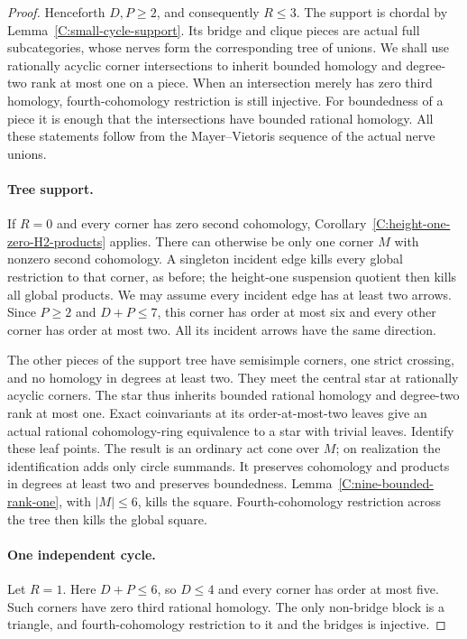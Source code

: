 \begin{proof}
Henceforth $D,P\geq2$, and consequently $R\leq3$.
The support is chordal by Lemma~\ref{C:small-cycle-support}.
Its bridge and clique pieces are actual full subcategories,
whose nerves form the corresponding tree of unions.
We shall use rationally acyclic corner intersections to
inherit bounded homology and degree-two rank at most one
on a piece.  When an intersection merely has zero third
homology, fourth-cohomology restriction is still injective.
For boundedness of a piece it is enough that the intersections
have bounded rational homology.  All these statements follow
from the Mayer--Vietoris sequence of the actual nerve unions.

\paragraph{Tree support.}
If $R=0$ and every corner has zero second cohomology,
Corollary~\ref{C:height-one-zero-H2-products} applies.
There can otherwise be only one corner $M$ with nonzero
second cohomology.  A singleton incident edge kills every
global restriction to that corner, as before; the
height-one suspension quotient then kills all global products.
We may assume every incident edge has at least two arrows.
Since $P\geq2$ and $D+P\leq7$, this corner has order at
most six and every other corner has order at most two.
All its incident arrows have the same direction.

The other pieces of the support tree have semisimple
corners, one strict crossing, and no homology in degrees
at least two.  They meet the central star at rationally
acyclic corners.  The star thus inherits bounded rational
homology and degree-two rank at most one.  Exact coinvariants
at its order-at-most-two leaves give an actual rational
cohomology-ring equivalence to a star with trivial leaves.
Identify these leaf points.  The result is an ordinary
act cone over $M$; on realization the identification adds
only circle summands.  It preserves cohomology and products
in degrees at least two and preserves boundedness.
Lemma~\ref{C:nine-bounded-rank-one}, with $|M|\leq6$,
kills the square.  Fourth-cohomology restriction across
the tree then kills the global square.

\paragraph{One independent cycle.}
Let $R=1$.  Here $D+P\leq6$, so $D\leq4$ and
every corner has order at most five.  Such corners have
zero third rational homology.  The only non-bridge block
is a triangle, and fourth-cohomology restriction to it
and the bridges is injective.


\end{proof}

